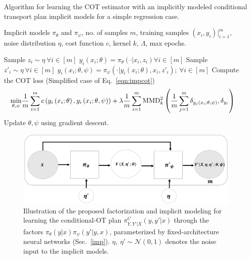 \begin{algorithm}[t]
        \caption[Algorithm for learning the proposed COT estimator with an implicitly modeled conditional transport plan.]{Algorithm for learning the COT estimator with an implicitly modeled conditional transport plan implicit models for a simple regression case.}
        \label{algo-imp}
\begin{algorithmic}[1]
        \Require Implicit models $\pi_{\theta}$ and $\pi_{\psi}$, no. of samples $m$, training samples $(x_i, y_i)|_{i=1}^m$, noise distribution $\eta$, cost function $c$, kernel $k$, $\Lambda$, max epochs.
 
        \State Sample $z_i\sim \eta \ \forall i \in [m]$
        \State $y_i(x_i; \theta)=\pi_\theta(\cdot|x_i, z_i) \forall i\in [m]$
        \State Sample $z'_{i}\sim \eta \  \forall i\in [m]$
        \State $y_i (x_i; \theta, \psi) = \pi_\psi(\cdot|y_i (x_i; \theta), x_i, z'_{i}) ;\  \forall i\in [m]$
        \State Compute the COT loss (Simplified case of Eq.~\ref{eqn:impcot})
        \begin{align*} 
        \min_{\theta, \psi}&\frac{1}{m}\sum_{i=1}^m c\left(y_{i}\left(x_i;\theta\right), y_i\left(x_i;\theta,\psi\right)\right) +\lambda\frac{1}{m}\sum_{i=1}^m\textup{MMD}_k^2\left(\frac{1}{m}\sum_{j=1}^m\delta_{y_{j}\left(x_i;\theta,\psi\right) }, \delta_{y_i}\right)
        \end{align*}
        \State Update $\theta, \psi$ using gradient descent. 
        \EndWhile   
\end{algorithmic}
\end{algorithm}
\begin{figure}[t]
\centering
\includegraphics[width=0.6\columnwidth]{chapter-3/images/fig1.pdf}
\caption[Illustration of the proposed factorization and implicit modeling for learning the conditional-OT plan]{Illustration of the proposed factorization and implicit modeling for learning the conditional-OT plan $\pi^C_{Y, Y'|X}(y, y'|x)$ through the factors $\pi_\theta(y|x) \pi_\psi(y'|y, x)$, parameterized by fixed-architecture neural networks (Sec.~\ref{imp}). $\eta, \ \eta'\sim \mathcal{N}(0, 1)$ denotes the noise input to the implicit models.}
\label{implicit-model}
\end{figure}


